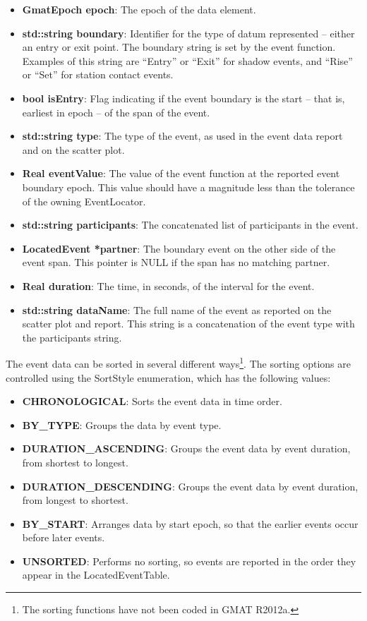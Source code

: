 \documentclass[letterpaper,10pt]{article}
\begin{document}
\begin{itemize}
\item \textbf{GmatEpoch epoch}: The epoch of the data element.
\item \textbf{std::string boundary}: Identifier for the type of datum
represented -- either an entry or exit point.  The boundary string is set by
the event function.  Examples of this string are ``Entry'' or ``Exit'' for
shadow events, and ``Rise'' or ``Set'' for station contact events.
\item \textbf{bool isEntry}: Flag indicating if the event boundary is the start
-- that is, earliest in epoch -- of the span of the event.
\item \textbf{std::string type}: The type of the event, as used in the event
data report and on the scatter plot.
\item \textbf{Real eventValue}: The value of the event function at the reported
event boundary epoch.  This value should have a magnitude less than the
tolerance of the owning EventLocator.
\item \textbf{std::string participants}: The concatenated list of participants
in the event.
\item \textbf{LocatedEvent *partner}: The boundary event on the other side of
the event span.  This pointer is NULL if the span has no matching partner.
\item \textbf{Real duration}: The time, in seconds, of the interval for the
event.
\item \textbf{std::string dataName}: The full name of the event as reported on
the scatter plot and report.  This string is a concatenation of the event type
with the participants string.
\end{itemize}

The event data can be sorted in several different ways\footnote{The sorting functions have not been coded in GMAT R2012a.}.  The sorting options
are controlled using the SortStyle enumeration, which has the following values:

\begin{itemize}
\item \textbf{CHRONOLOGICAL}: Sorts the event data in time order.
\item \textbf{BY\_TYPE}: Groups the data by event type.
\item \textbf{DURATION\_ASCENDING}: Groups the event data by event duration,
from shortest to longest.
\item \textbf{DURATION\_DESCENDING}: Groups the event data by event duration,
from longest to shortest.
\item \textbf{BY\_START}: Arranges data by start epoch, so that the earlier
events occur before later events.
\item \textbf{UNSORTED}: Performs no sorting, so events are reported in the
order they appear in the LocatedEventTable.
\end{itemize}
\end{document}
